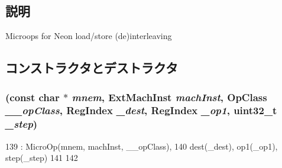 \subsection{説明}
Microops for Neon load/store (de)interleaving 

\subsection{コンストラクタとデストラクタ}
\hypertarget{classArmISA_1_1MicroNeonMixOp_a36be9fd8ff3c4724827aa6d7be82356c}{
\subsubsection[{MicroNeonMixOp}]{ (const char $\ast$ {\em mnem}, \/  {\bf ExtMachInst} {\em machInst}, \/  OpClass {\em \_\-\_\-opClass}, \/  {\bf RegIndex} {\em \_\-dest}, \/  {\bf RegIndex} {\em \_\-op1}, \/  {\bf uint32\_\-t} {\em \_\-step})}}
\label{classArmISA_1_1MicroNeonMixOp_a36be9fd8ff3c4724827aa6d7be82356c}



\begin{DoxyCode}
139             : MicroOp(mnem, machInst, __opClass),
140               dest(_dest), op1(_op1), step(_step)
141     {
142     }
\end{DoxyCode}


